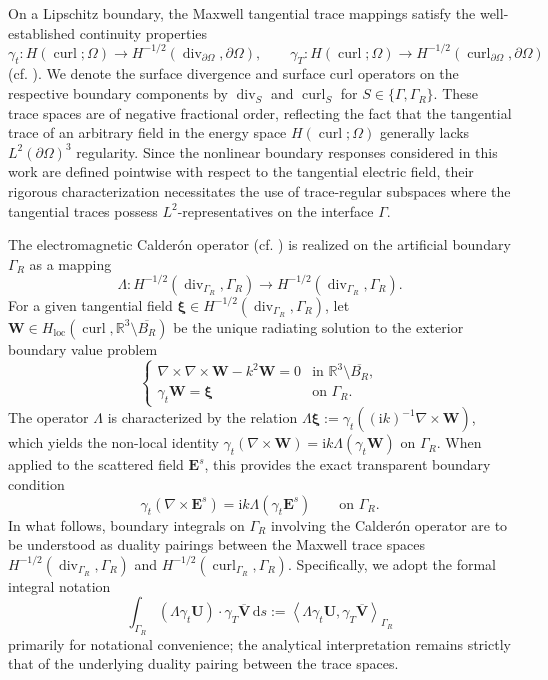 \documentclass[12pt,reqno]{amsart}
\theoremstyle{definition}
\numberwithin{equation}{section}
\begin{document}
On a Lipschitz boundary, the Maxwell tangential trace mappings satisfy the well-established continuity properties
\[
\gamma_t \colon H(\operatorname{curl}; \Omega) \to H^{-1/2}(\operatorname{div}_{\partial\Omega}, \partial\Omega), \qquad \gamma_T \colon H(\operatorname{curl}; \Omega) \to H^{-1/2}(\operatorname{curl}_{\partial\Omega}, \partial\Omega)
\]
(cf. \cite{BuffaCostabelSheen2002}). We denote the surface divergence and surface curl operators on the respective boundary components by $\operatorname{div}_S$ and $\operatorname{curl}_S$ for $S \in \{\Gamma, \Gamma_R\}$. These trace spaces are of negative fractional order, reflecting the fact that the tangential trace of an arbitrary field in the energy space $H(\operatorname{curl}; \Omega)$ generally lacks $L^2(\partial\Omega)^3$ regularity. Since the nonlinear boundary responses considered in this work are defined pointwise with respect to the tangential electric field, their rigorous characterization necessitates the use of trace-regular subspaces where the tangential traces possess $L^2$-representatives on the interface $\Gamma$.


The electromagnetic Calder\'on operator (cf. \cite{KirschMonk1995, Monk2003}) is realized on the artificial boundary $\Gamma_R$ as a mapping 
\[
\Lambda \colon H^{-1/2}(\operatorname{div}_{\Gamma_R}, \Gamma_R) \to H^{-1/2}(\operatorname{div}_{\Gamma_R}, \Gamma_R).
\]
For a given tangential field $\boldsymbol{\xi} \in H^{-1/2}(\operatorname{div}_{\Gamma_R}, \Gamma_R)$, let $\mathbf{W} \in H_{\mathrm{loc}}(\operatorname{curl}, \mathbb{R}^3 \setminus \overline{B_R})$ be the unique radiating solution to the exterior boundary value problem
\[
\begin{cases}
\nabla \times \nabla \times \mathbf{W} - k^2 \mathbf{W} = 0 & \text{in } \mathbb{R}^3 \setminus \overline{B_R}, \\
\gamma_t \mathbf{W} = \boldsymbol{\xi} & \text{on } \Gamma_R.
\end{cases}
\]
The operator $\Lambda$ is characterized by the relation $\Lambda \boldsymbol{\xi} := \gamma_t((\mathrm{i}k)^{-1} \nabla \times \mathbf{W})$, which yields the non-local identity $\gamma_t(\nabla \times \mathbf{W}) = \mathrm{i}k \Lambda(\gamma_t \mathbf{W})$ on $\Gamma_R$. When applied to the scattered field $\mathbf{E}^s$, this provides the exact transparent boundary condition
\begin{equation}\label{eq:calderon_condition1}
\gamma_t(\nabla \times \mathbf{E}^s) = \mathrm{i}k \Lambda(\gamma_t \mathbf{E}^s) \qquad \text{on } \Gamma_R.
\end{equation}
In what follows, boundary integrals on $\Gamma_R$ involving the Calder\'on operator are to be understood as duality pairings between the Maxwell trace spaces $H^{-1/2}(\operatorname{div}_{\Gamma_R}, \Gamma_R)$ and $H^{-1/2}(\operatorname{curl}_{\Gamma_R}, \Gamma_R)$. Specifically, we adopt the formal integral notation
\[
\int_{\Gamma_R} (\Lambda \gamma_t \mathbf{U}) \cdot \gamma_T \overline{\mathbf{V}} \, \mathrm{d}s := \left\langle \Lambda \gamma_t \mathbf{U}, \gamma_T \overline{\mathbf{V}} \right\rangle_{\Gamma_R}
\]
primarily for notational convenience; the analytical interpretation remains strictly that of the underlying duality pairing between the trace spaces.
\end{document}
